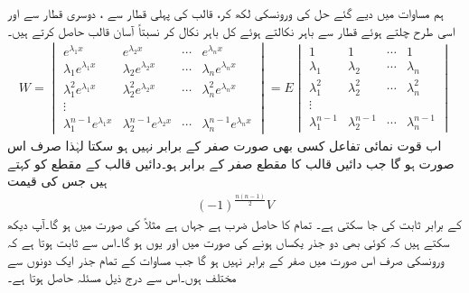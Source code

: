 ہم مساوات  میں دیے گئے حل کی ورونسکی لکھ کر، قالب کی پہلی قطار سے ، دوسری قطار سے  اور اسی طرح چلتے ہوئے  قطار سے   باہر نکالتے ہوئے کل  باہر  نکال کر نسبتاً آسان قالب حاصل کرتے ہیں۔
\begin{align}\label{مساوات_سادہ_بلند_ورونسکی_قالب_لمبی_الف}
W=
\begin{vmatrix}
e^{\lambda_1 x} & e^{\lambda_2 x} & \cdots & e^{\lambda_n x}\\
\lambda_1e^{\lambda_1 x} & \lambda_2e^{\lambda_2 x} & \cdots & \lambda_ne^{\lambda_n x}\\
\lambda_1^2 e^{\lambda_1 x} & \lambda_2^2 e^{\lambda_2 x} & \cdots & \lambda_n^2 e^{\lambda_n x}\\
\vdots & & \\ 
\lambda_1^{n-1}e^{\lambda_1 x} & \lambda_2^{n-1}e^{\lambda_2 x} & \cdots & \lambda_n^{n-1} e^{\lambda_n x}
\end{vmatrix}
=E
\begin{vmatrix}
1& 1 & \cdots & 1\\
\lambda_1& \lambda_2 & \cdots & \lambda_n\\
\lambda_1^2& \lambda_2^2 & \cdots & \lambda_n^2\\
\vdots & & \\ 
\lambda_1^{n-1} & \lambda_2^{n-1} & \cdots & \lambda_n^{n-1} 
\end{vmatrix}
\end{align}
اب قوت نمائی تفاعل  کسی بھی صورت صفر کے برابر نہیں ہو سکتا لہٰذا  صرف اس صورت ہو گا جب دائیں قالب کا مقطع صفر کے برابر ہو۔دائیں قالب کے مقطع کو  کہتے ہیں جس کی قیمت
\begin{align}\label{مساوات_سادہ_بلند_ورونسکی_قالب_لمبی_ب}
(-1)^{\frac{n(n-1)}{2}}V
\end{align}
کے برابر ثابت کی جا سکتی ہے۔  تمام  کا حاصل ضرب ہے جہاں  ہے مثلاً  کی صورت میں  ہو گا۔آپ دیکھ سکتے ہیں کہ کوئی بھی دو جذر یکساں ہونے کی صورت میں  اور یوں  ہو گا۔اس سے ثابت ہوتا ہے کہ ورونسکی صرف اس صورت میں صفر کے برابر نہیں ہو گا جب مساوات  کے تمام جذر ایک دونوں سے مختلف ہوں۔اس سے  درج ذیل مسئلہ حاصل ہوتا ہے۔

